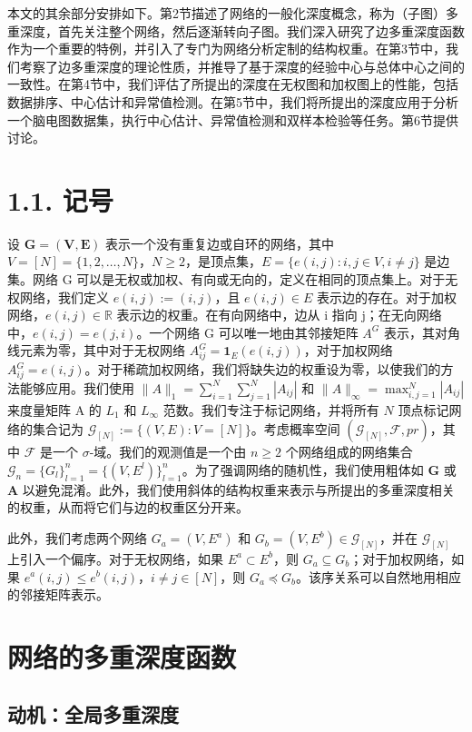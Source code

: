 \documentclass[
  10
]{article}
\begin{document}
本文的其余部分安排如下。第2节描述了网络的一般化深度概念，称为（子图）多重深度，首先关注整个网络，然后逐渐转向子图。我们深入研究了边多重深度函数作为一个重要的特例，并引入了专门为网络分析定制的结构权重。在第3节中，我们考察了边多重深度的理论性质，并推导了基于深度的经验中心与总体中心之间的一致性。在第4节中，我们评估了所提出的深度在无权图和加权图上的性能，包括数据排序、中心估计和异常值检测。在第5节中，我们将所提出的深度应用于分析一个脑电图数据集，执行中心估计、异常值检测和双样本检验等任务。第6节提供讨论。

\section{1.1. 记号}

设 $\mathbf{G}=(\mathbf{V},\mathbf{E})$ 表示一个没有重复边或自环的网络，其中 $V=[N]=\{1,2,\dots,N\}$，$N\geq 2$，是顶点集，$E=\{e(i,j):i,j\in V,i\neq j\}$ 是边集。网络 G 可以是无权或加权、有向或无向的，定义在相同的顶点集上。对于无权网络，我们定义 $e(i,j):=(i,j)$，且 $e(i,j)\in E$ 表示边的存在。对于加权网络，$e(i,j)\in\mathbb{R}$ 表示边的权重。在有向网络中，边从 i 指向 j；在无向网络中，$e(i,j)=e(j,i)$。一个网络 G 可以唯一地由其邻接矩阵 $A^G$ 表示，其对角线元素为零，其中对于无权网络 $A_{ij}^G=\mathbf{1}_E(e(i,j))$，对于加权网络 $A_{ij}^G=e(i,j)$。对于稀疏加权网络，我们将缺失边的权重设为零，以使我们的方法能够应用。我们使用 $\|A\|_1=\sum_{i=1}^N\sum_{j=1}^N|A_{ij}|$ 和 $\|A\|_\infty=\max_{i,j=1}^N|A_{ij}|$ 来度量矩阵 A 的 $L_1$ 和 $L_\infty$ 范数。我们专注于标记网络，并将所有 $N$ 顶点标记网络的集合记为 $\mathcal{G}_{[N]}:=\{(V,E):V=[N]\}$。考虑概率空间 $(\mathcal{G}_{[N]},\mathcal{F},pr)$，其中 $\mathcal{F}$ 是一个 $\sigma$-域。我们的观测值是一个由 $n\geq 2$ 个网络组成的网络集合 $\mathcal{G}_n=\{G_l\}_{l=1}^n=\{(V,E^l)\}_{l=1}^n$。为了强调网络的随机性，我们使用粗体如 $\mathbf{G}$ 或 $\mathbf{A}$ 以避免混淆。此外，我们使用斜体的结构权重来表示与所提出的多重深度相关的权重，从而将它们与边的权重区分开来。

此外，我们考虑两个网络 $G_a=(V,E^a)$ 和 $G_b=(V,E^b)\in\mathcal{G}_{[N]}$，并在 $\mathcal{G}_{[N]}$ 上引入一个偏序。对于无权网络，如果 $E^a\subset E^b$，则 $G_a\subseteq G_b$；对于加权网络，如果 $e^a(i,j)\leq e^b(i,j)$，$i\neq j\in[N]$，则 $G_a\preceq G_b$。该序关系可以自然地用相应的邻接矩阵表示。

\section{网络的多重深度函数}

\subsection{动机：全局多重深度}
\end{document}
